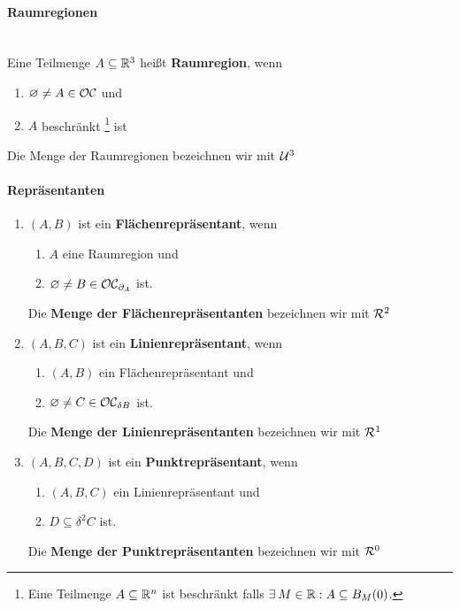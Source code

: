 

\newcommand{\overviewnumber}{3}
\newcommand{\overviewname}{\strukt}




\paragraph{Raumregionen}\ \\
    Eine Teilmenge $A \subseteq \mathbb{R}^3$ heißt \textbf{Raumregion}, wenn
    \begin{enumerate}
        \item $\varnothing \neq A \in \mathcal{OC}$ und
        \item $A$ beschränkt%
                \footnote{Eine Teilmenge $A \subseteq \mathbb{R}^n$ ist beschränkt falls $\exists\: M \in \mathbb{R} : A \subseteq B_M(0)$.}
                ist
    \end{enumerate}
    Die Menge der Raumregionen bezeichnen wir mit $\mathcal{U}^3$


\paragraph{Repräsentanten}
%
        \begin{enumerate}
            \item $(A,B)$ ist ein \textbf{Flächenrepräsentant}, wenn 
                \begin{enumerate}
                    \item $A$ eine Raumregion und
                    \item $\varnothing \neq B \in \mathcal{OC}_{\partial_A}$ ist.
                \end{enumerate}
                Die \textbf{Menge der Flächenrepräsentanten} bezeichnen wir mit $\mathcal{R}^2$
            \item $(A,B,C)$ ist ein \textbf{Linienrepräsentant}, wenn 
                \begin{enumerate}
                    \item $(A,B)$ ein Flächenrepräsentant und
                    \item $\varnothing \neq C \in \mathcal{OC}_{\delta B}$ ist.
                \end{enumerate}
                Die \textbf{Menge der Linienrepräsentanten} bezeichnen wir mit $\mathcal{R}^1$
            \item $(A,B,C,D)$ ist ein \textbf{Punktrepräsentant}, wenn 
                \begin{enumerate}
                    \item $(A,B,C)$ ein Linienrepräsentant und
                    \item $D \subseteq \delta^2 C$ ist.
                \end{enumerate}
                Die \textbf{Menge der Punktrepräsentanten} bezeichnen wir mit $\mathcal{R}^0$
        \end{enumerate}


